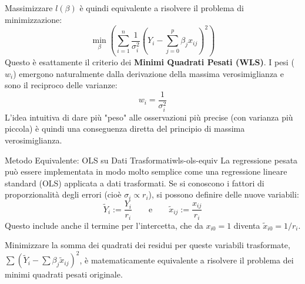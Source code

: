 Massimizzare \(l(\beta)\) è quindi equivalente a risolvere il problema di
minimizzazione:
\[
    \min_{\beta} \left( \sum_{i=1}^{n} \frac{1}{\sigma_i^2} (Y_i -
    \sum_{j=0}^{p} \beta_j x_{ij})^2 \right)
\]
Questo è esattamente il criterio dei \textbf{Minimi Quadrati Pesati (WLS)}. I
pesi (\(w_i\)) emergono naturalmente dalla derivazione della massima
verosimiglianza e sono il reciproco delle varianze:
\[ w_i = \frac{1}{\sigma_i^2} \]
L'idea intuitiva di dare più "peso" alle osservazioni più precise (con
varianza più piccola) è quindi una conseguenza diretta del principio di
massima verosimiglianza.

\begin{nota}{Metodo Equivalente: OLS su Dati Trasformati}{wls-ols-equiv}
La regressione pesata può essere implementata in modo molto semplice come una
regressione lineare standard (OLS) applicata a dati trasformati. Se si conoscono
i fattori di proporzionalità degli errori (cioè \(\sigma_i \propto r_i\)), si
possono definire delle nuove variabili:
\[
    \tilde{Y}_i := \frac{Y_i}{r_i} \qquad \text{e} \qquad \tilde{x}_{ij} :=
    \frac{x_{ij}}{r_i}
\]
Questo include anche il termine per l'intercetta, che da \(x_{i0}=1\) diventa
\(\tilde{x}_{i0} = 1/r_i\).

Minimizzare la somma dei quadrati dei residui per queste variabili trasformate,
\(\sum(\tilde{Y}_i - \sum \beta_j \tilde{x}_{ij})^2\), è matematicamente
equivalente a risolvere il problema dei minimi quadrati pesati originale.
\end{nota}
